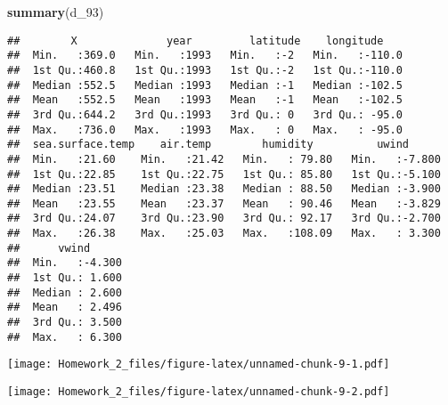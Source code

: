 \documentclass[]{article}
\newenvironment{Shaded}{\begin{snugshade}}{\end{snugshade}}
\newcommand{\KeywordTok}[1]{\textcolor[rgb]{0.13,0.29,0.53}{\textbf{#1}}}
\newcommand{\DataTypeTok}[1]{\textcolor[rgb]{0.13,0.29,0.53}{#1}}
\newcommand{\DecValTok}[1]{\textcolor[rgb]{0.00,0.00,0.81}{#1}}
\newcommand{\StringTok}[1]{\textcolor[rgb]{0.31,0.60,0.02}{#1}}
\newcommand{\OperatorTok}[1]{\textcolor[rgb]{0.81,0.36,0.00}{\textbf{#1}}}
\newcommand{\NormalTok}[1]{#1}
\begin{document}
\begin{Shaded}
\begin{Highlighting}[]
\KeywordTok{summary}\NormalTok{(d_}\DecValTok{93}\NormalTok{)}
\end{Highlighting}
\end{Shaded}

\begin{verbatim}
##        X              year         latitude    longitude     
##  Min.   :369.0   Min.   :1993   Min.   :-2   Min.   :-110.0  
##  1st Qu.:460.8   1st Qu.:1993   1st Qu.:-2   1st Qu.:-110.0  
##  Median :552.5   Median :1993   Median :-1   Median :-102.5  
##  Mean   :552.5   Mean   :1993   Mean   :-1   Mean   :-102.5  
##  3rd Qu.:644.2   3rd Qu.:1993   3rd Qu.: 0   3rd Qu.: -95.0  
##  Max.   :736.0   Max.   :1993   Max.   : 0   Max.   : -95.0  
##  sea.surface.temp    air.temp        humidity          uwind       
##  Min.   :21.60    Min.   :21.42   Min.   : 79.80   Min.   :-7.800  
##  1st Qu.:22.85    1st Qu.:22.75   1st Qu.: 85.80   1st Qu.:-5.100  
##  Median :23.51    Median :23.38   Median : 88.50   Median :-3.900  
##  Mean   :23.55    Mean   :23.37   Mean   : 90.46   Mean   :-3.829  
##  3rd Qu.:24.07    3rd Qu.:23.90   3rd Qu.: 92.17   3rd Qu.:-2.700  
##  Max.   :26.38    Max.   :25.03   Max.   :108.09   Max.   : 3.300  
##      vwind       
##  Min.   :-4.300  
##  1st Qu.: 1.600  
##  Median : 2.600  
##  Mean   : 2.496  
##  3rd Qu.: 3.500  
##  Max.   : 6.300
\end{verbatim}

\begin{Shaded}
\end{Shaded}

\texttt{[image: Homework\_2\_files/figure-latex/unnamed-chunk-9-1.pdf]}

\begin{Shaded}
\end{Shaded}

\texttt{[image: Homework\_2\_files/figure-latex/unnamed-chunk-9-2.pdf]}
\end{document}
